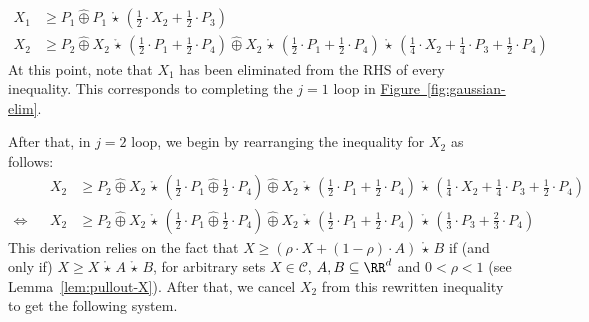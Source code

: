 \documentclass[10pt]{amsart}
\theoremstyle{plain}
\theoremstyle{definition}
\providecommand{\namedref}[2]{\hyperref[#2]{#1~\ref*{#2}}\xspace}
\providecommand{\figureref}[1]{\namedref{Figure}{fig:#1}}
\providecommand{\cC}[0]{\ensuremath{\mathcal C}\xspace}
\let\geq\geqslant
\providecommand{\cplus}[0]{\ensuremath{\hat{\oplus}}\xspace}
\providecommand{\cmult}[0]{\ensuremath{{\,\mathring{\star}\,}}\xspace}
\providecommand{\convset}[0]{\ensuremath{\cC}\xspace}
\begin{document}
    \begin{align*}
        X_1 &\geq P_1 \cplus P_1 \cmult \left(\frac12\cdot X_2 + \frac12\cdot P_3\right)\\
        X_2 &\geq P_2 \cplus X_2\cmult\left(\frac12\cdot P_1 + \frac12\cdot P_4\right) 
            \cplus X_2\cmult\left(\frac12\cdot P_1+\frac12\cdot P_4\right)\cmult \left(\frac14\cdot X_2 + \frac14\cdot P_3 + \frac12\cdot P_4\right)
    \end{align*}
At this point, note that $X_1$ has been eliminated from the RHS of every inequality. 
This corresponds to completing the $j=1$ loop in \figureref{gaussian-elim}.

After that, in $j=2$ loop, we begin by rearranging the inequality for $X_2$ as follows:
\begin{align*}
    && X_2 &\geq P_2 \cplus X_2\cmult\left(\frac12\cdot P_1 \cplus \frac12\cdot P_4\right) 
            \cplus X_2\cmult\left(\frac12\cdot P_1+\frac12\cdot P_4\right)\cmult \left(\frac14\cdot X_2 + \frac14\cdot P_3 + \frac12\cdot P_4\right)\\
    \iff&& X_2 &\geq P_2 \cplus X_2\cmult\left(\frac12\cdot P_1 \cplus \frac12\cdot P_4\right) 
            \cplus X_2\cmult\left(\frac12\cdot P_1+\frac12\cdot P_4\right)\cmult \left(\frac13\cdot P_3 + \frac23\cdot P_4\right)
\end{align*}
This derivation relies on the fact that $X\geq \left(\rho\cdot X + (1-\rho)\cdot A\right)\cmult B$ if (and only if) $X\geq X\cmult A\cmult B$, for arbitrary sets $X\in\convset$, $A,B\subseteq \RR^d$ and $0<\rho<1$ (see Lemma~\ref{lem:pullout-X}). 
After that, we cancel $X_2$ from this rewritten inequality to get the following system. 
\end{document}
